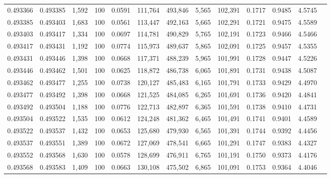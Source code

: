 \begin{tabular}{rrrrrrrrrrrrr}
0.493366 & 0.493385 & 1,592 & 100 &                                     0.0591 & 111,764 & 493,846 &   5,565 & 102,391 & 0.1717 & 0.9485 & 4.5745 \\
0.493385 & 0.493403 & 1,683 & 100 &                                     0.0561 & 113,447 & 492,163 &   5,665 & 102,291 & 0.1721 & 0.9475 & 4.5589 \\
0.493403 & 0.493417 & 1,334 & 100 &                                     0.0697 & 114,781 & 490,829 &   5,765 & 102,191 & 0.1723 & 0.9466 & 4.5466 \\
0.493417 & 0.493431 & 1,192 & 100 &                                     0.0774 & 115,973 & 489,637 &   5,865 & 102,091 & 0.1725 & 0.9457 & 4.5355 \\
0.493431 & 0.493446 & 1,398 & 100 &                                     0.0668 & 117,371 & 488,239 &   5,965 & 101,991 & 0.1728 & 0.9447 & 4.5226 \\
0.493446 & 0.493462 & 1,501 & 100 &                                     0.0625 & 118,872 & 486,738 &   6,065 & 101,891 & 0.1731 & 0.9438 & 4.5087 \\
0.493462 & 0.493477 & 1,255 & 100 &                                     0.0738 & 120,127 & 485,483 &   6,165 & 101,791 & 0.1733 & 0.9429 & 4.4970 \\
0.493477 & 0.493492 & 1,398 & 100 &                                     0.0668 & 121,525 & 484,085 &   6,265 & 101,691 & 0.1736 & 0.9420 & 4.4841 \\
0.493492 & 0.493504 & 1,188 & 100 &                                     0.0776 & 122,713 & 482,897 &   6,365 & 101,591 & 0.1738 & 0.9410 & 4.4731 \\
0.493504 & 0.493522 & 1,535 & 100 &                                     0.0612 & 124,248 & 481,362 &   6,465 & 101,491 & 0.1741 & 0.9401 & 4.4589 \\
0.493522 & 0.493537 & 1,432 & 100 &                                     0.0653 & 125,680 & 479,930 &   6,565 & 101,391 & 0.1744 & 0.9392 & 4.4456 \\
0.493537 & 0.493551 & 1,389 & 100 &                                     0.0672 & 127,069 & 478,541 &   6,665 & 101,291 & 0.1747 & 0.9383 & 4.4327 \\
0.493552 & 0.493568 & 1,630 & 100 &                                     0.0578 & 128,699 & 476,911 &   6,765 & 101,191 & 0.1750 & 0.9373 & 4.4176 \\
0.493568 & 0.493583 & 1,409 & 100 &                                     0.0663 & 130,108 & 475,502 &   6,865 & 101,091 & 0.1753 & 0.9364 & 4.4046 \\

\end{tabular}
